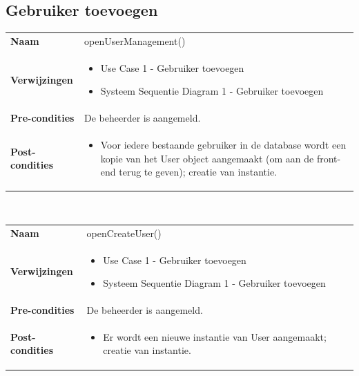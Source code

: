 \documentclass[a4paper]{article}
\begin{document}
\subsection{Gebruiker toevoegen}
\begin{tabularx}{\textwidth}{|l X|}
    \hline
    \textbf{Naam} & openUserManagement() \\
    \textbf{Verwijzingen} & \begin{itemize}[leftmargin=*]
        \item Use Case 1 - Gebruiker toevoegen
        \item Systeem Sequentie Diagram 1 - Gebruiker toevoegen
    \end{itemize}\\
    \textbf{Pre-condities} & De beheerder is aangemeld.\\
    \textbf{Post-condities} & \begin{itemize}[leftmargin=*]
        \item Voor iedere bestaande gebruiker in de database wordt een kopie van het User object aangemaakt (om aan de front-end terug te geven); creatie van instantie.
    \end{itemize}\\
    \hline
\end{tabularx}\\

\begin{tabularx}{\textwidth}{|l X|}
    \hline
    \textbf{Naam} & openCreateUser() \\
    \textbf{Verwijzingen} & \begin{itemize}[leftmargin=*]
        \item Use Case 1 - Gebruiker toevoegen
        \item Systeem Sequentie Diagram 1 - Gebruiker toevoegen
    \end{itemize}\\
    \textbf{Pre-condities} & De beheerder is aangemeld.\\
    \textbf{Post-condities} & \begin{itemize}[leftmargin=*]
        \item Er wordt een nieuwe instantie van User aangemaakt; creatie van instantie.
    \end{itemize}\\
    \hline
\end{tabularx}
\end{document}

